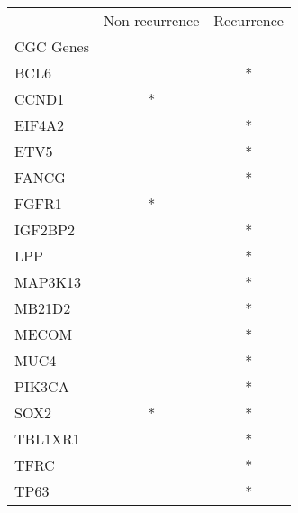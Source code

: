 \begin{tabular}{lcc}
\toprule
{} & Non-recurrence & Recurrence \\
CGC Genes &                &            \\
\midrule
BCL6      &                &          * \\
CCND1     &              * &            \\
EIF4A2    &                &          * \\
ETV5      &                &          * \\
FANCG     &                &          * \\
FGFR1     &              * &            \\
IGF2BP2   &                &          * \\
LPP       &                &          * \\
MAP3K13   &                &          * \\
MB21D2    &                &          * \\
MECOM     &                &          * \\
MUC4      &                &          * \\
PIK3CA    &                &          * \\
SOX2      &              * &          * \\
TBL1XR1   &                &          * \\
TFRC      &                &          * \\
TP63      &                &          * \\
\bottomrule
\end{tabular}
